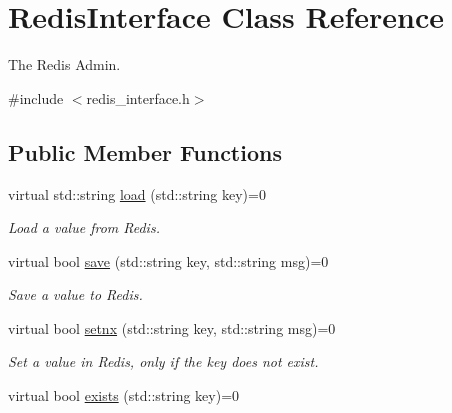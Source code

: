 \hypertarget{classRedisInterface}{}\section{Redis\+Interface Class Reference}
\label{classRedisInterface}


The Redis Admin.  




{\ttfamily \#include $<$redis\+\_\+interface.\+h$>$}

\subsection*{Public Member Functions}
\begin{DoxyCompactItemize}
\item 
virtual std\+::string \hyperlink{classRedisInterface_a13dca0045887adbf90dd8f11c007d02d}{load} (std\+::string key)=0\hypertarget{classRedisInterface_a13dca0045887adbf90dd8f11c007d02d}{}\label{classRedisInterface_a13dca0045887adbf90dd8f11c007d02d}

\begin{DoxyCompactList}\small\item\em Load a value from Redis. \end{DoxyCompactList}\item 
virtual bool \hyperlink{classRedisInterface_a60b25df720d353d426567f10a8fca483}{save} (std\+::string key, std\+::string msg)=0\hypertarget{classRedisInterface_a60b25df720d353d426567f10a8fca483}{}\label{classRedisInterface_a60b25df720d353d426567f10a8fca483}

\begin{DoxyCompactList}\small\item\em Save a value to Redis. \end{DoxyCompactList}\item 
virtual bool \hyperlink{classRedisInterface_aadbf5e9040bd896e9411da407459e426}{setnx} (std\+::string key, std\+::string msg)=0\hypertarget{classRedisInterface_aadbf5e9040bd896e9411da407459e426}{}\label{classRedisInterface_aadbf5e9040bd896e9411da407459e426}

\begin{DoxyCompactList}\small\item\em Set a value in Redis, only if the key does not exist. \end{DoxyCompactList}\item 
virtual bool \hyperlink{classRedisInterface_a1ddea059a6bc0c4503cd98ef520beac0}{exists} (std\+::string key)=0\hypertarget{classRedisInterface_a1ddea059a6bc0c4503cd98ef520beac0}{}\label{classRedisInterface_a1ddea059a6bc0c4503cd98ef520beac0}


\end{DoxyCompactItemize}
